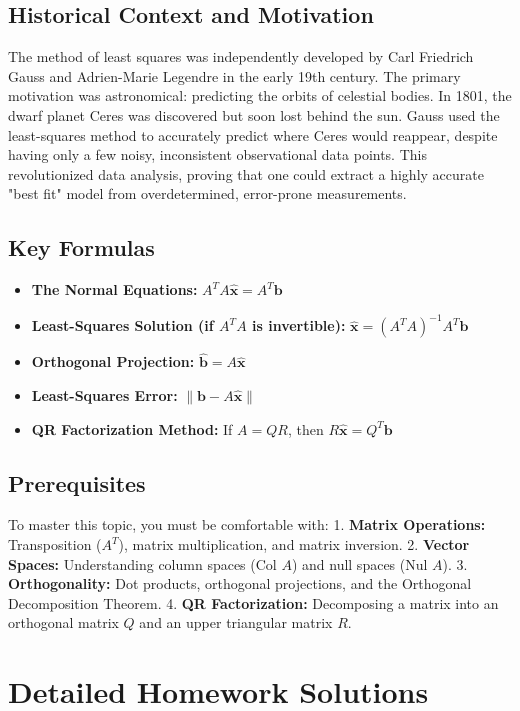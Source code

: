 \documentclass[11pt, letterpaper]{article}
\theoremstyle{definition}
\theoremstyle{remark}
\begin{document}
\subsection{Historical Context and Motivation}
The method of least squares was independently developed by Carl Friedrich Gauss and Adrien-Marie Legendre in the early 19th century. The primary motivation was astronomical: predicting the orbits of celestial bodies. In 1801, the dwarf planet Ceres was discovered but soon lost behind the sun. Gauss used the least-squares method to accurately predict where Ceres would reappear, despite having only a few noisy, inconsistent observational data points. This revolutionized data analysis, proving that one could extract a highly accurate "best fit" model from overdetermined, error-prone measurements.

\subsection{Key Formulas}
\begin{itemize}
    \item \textbf{The Normal Equations:} $A^T A \hat{\mathbf{x}} = A^T \mathbf{b}$
    \item \textbf{Least-Squares Solution (if $A^T A$ is invertible):} $\hat{\mathbf{x}} = (A^T A)^{-1} A^T \mathbf{b}$
    \item \textbf{Orthogonal Projection:} $\hat{\mathbf{b}} = A\hat{\mathbf{x}}$
    \item \textbf{Least-Squares Error:} $\|\mathbf{b} - A\hat{\mathbf{x}}\|$
    \item \textbf{QR Factorization Method:} If $A = QR$, then $R\hat{\mathbf{x}} = Q^T \mathbf{b}$
\end{itemize}

\subsection{Prerequisites}
To master this topic, you must be comfortable with:
1. \textbf{Matrix Operations:} Transposition ($A^T$), matrix multiplication, and matrix inversion.
2. \textbf{Vector Spaces:} Understanding column spaces ($\text{Col } A$) and null spaces ($\text{Nul } A$).
3. \textbf{Orthogonality:} Dot products, orthogonal projections, and the Orthogonal Decomposition Theorem.
4. \textbf{QR Factorization:} Decomposing a matrix into an orthogonal matrix $Q$ and an upper triangular matrix $R$.

\newpage
\section{Detailed Homework Solutions}
\end{document}
